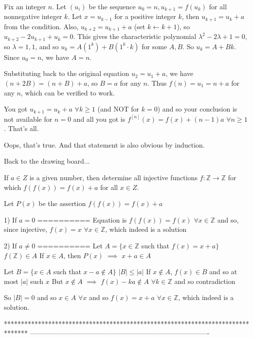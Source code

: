 \begin{solution}
	\begin{tcolorbox}Fix an integer $n$. Let $(u_i)$ be the sequence $u_0 = n, u_{k+1} = f(u_k)$ for all nonnegative integer $k$. Let $x = u_{k-1}$ for a positive integer $k$, then $u_{k+1} = u_k + a$ from the condition. Also, $u_{k+2} = u_{k+1} + a$ (set $k \leftarrow k+1$), so $u_{k+2} - 2u_{k+1} + u_k = 0$. This gives the characteristic polynomial $\lambda^2 - 2\lambda + 1 = 0$, so $\lambda = 1, 1$, and so $u_k = A(1^k) + B(1^k \cdot k)$ for some $A,B$. So $u_k = A + Bk$. Since $u_0 = n$, we have $A = n$.

Substituting back to the original equation $u_2 = u_1 + a$, we have $(n+2B) = (n+B) + a$, so $B = a$ for any $n$. Thus $f(n) = u_1 = n+a$ for any $n$, which can be verified to work.\end{tcolorbox}
You got $u_{k+1}=u_k+a$ $\forall k\ge 1$ (and NOT for $k=0$) and so your conclusion is not available for $n=0$ and all you got is $f^{[n]}(x)=f(x)+(n-1)a$ $\forall n\ge 1$. That's all.
\end{solution}



\begin{solution}
	Oops, that's true. And that statement is also obvious by induction.

Back to the drawing board...
\end{solution}



\begin{solution}
	\begin{tcolorbox}If $a{\in}Z$ is a given number, then determine all injective functions $f:  \mathbb{Z}\to\mathbb{Z}$ for which $f(f(x))=f(x)+a$ for all $x{\in}Z$.\end{tcolorbox}
Let $P(x)$ be the assertion $f(f(x))=f(x)+a$

1) If $a=0$
==========
Equation is $f(f(x))=f(x)$ $\forall x\in \mathbb Z$ and so, since injective, $\boxed{f(x)=x}$ $\forall x\in\mathbb Z$, which indeed is a solution

2) If $a\ne 0$
==========
Let $A=\{x\in\mathbb Z$ such that $f(x)=x+a\}$
$f(\mathbb Z)\in A$
If $x\in A$, then $P(x)$ $\implies$ $x+a\in A$

Let $B=\{x\in A$ such that $x-a\notin A\}$
$|B|\le |a|$
If $x\notin A$, $f(x)\in B$ and so at most $|a|$ such $x$
But $x\notin A$ $\implies$ $f(x)-ka\notin A$ $\forall k\in\mathbb Z$ and so contradiction

So $|B|=0$ and so $x\in A$ $\forall x$ and so $\boxed{f(x)=x+a}$ $\forall x\in\mathbb Z$, which indeed is a solution.
\end{solution}
*******************************************************************************
-------------------------------------------------------------------------------

